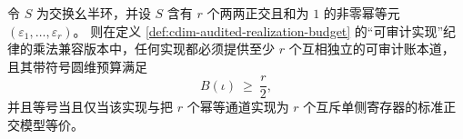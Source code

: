 \begin{conjecture}[乘法通道强制的最小半圆维预算]\label{conj:cdim-semiring-idempotent-budget}
令 \(S\) 为交换幺半环，并设 \(S\) 含有 \(r\) 个两两正交且和为 \(1\) 的非零幂等元 \((\varepsilon_1,\dots,\varepsilon_r)\)。
则在定义 \ref{def:cdim-audited-realization-budget} 的“可审计实现”纪律的乘法兼容版本中，任何实现都必须提供至少 \(r\) 个互相独立的可审计账本道，且其带符号圆维预算满足
\[
B(\iota)\ \ge\ \frac{r}{2},
\]
并且等号当且仅当该实现与把 \(r\) 个幂等通道实现为 \(r\) 个互斥单侧寄存器的标准正交模型等价。
\end{conjecture}

\endinput
